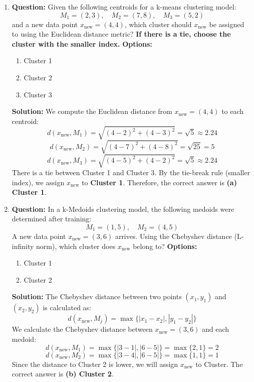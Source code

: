 \documentclass{article}
\begin{document}
\begin{enumerate}

\item \textbf{Question:} \newline
Given the following centroids for a k-means clustering model:
\[
M_1 = (2, 3), \quad M_2 = (7, 8), \quad M_3 = (5, 2)
\]
and a new data point $x_{\text{new}} = (4, 4)$, which cluster should
$x_{\text{new}}$ be assigned to using the Euclidean distance metric?
\textbf{If there is a tie, choose the cluster with the smaller index.}
\newline \newline
\textbf{Options:}
\begin{enumerate}
    \item Cluster 1
    \item Cluster 2
    \item Cluster 3
\end{enumerate}

\textbf{Solution:} \newline
We compute the Euclidean distance from $x_{\text{new}}=(4,4)$ to each centroid:
\[
d(x_{\text{new}}, M_1) = \sqrt{(4 - 2)^2 + (4 - 3)^2} = \sqrt{5} \approx 2.24
\]
\[
d(x_{\text{new}}, M_2) = \sqrt{(4 - 7)^2 + (4 - 8)^2} = \sqrt{25} = 5
\]
\[
d(x_{\text{new}}, M_3) = \sqrt{(4 - 5)^2 + (4 - 2)^2} = \sqrt{5} \approx 2.24
\]
There is a tie between Cluster 1 and Cluster 3. By the tie-break rule (smaller
index), we assign $x_{\text{new}}$ to \textbf{Cluster 1}. Therefore, the correct
answer is \textbf{(a) Cluster 1}.


\item \textbf{Question:} \newline
    In a k-Medoids clustering model, the following medoids were determined after training:
    \[
    M_1 = (1, 5), \quad M_2 = (4, 5)
    \]
    A new data point $x_{\text{new}} = (3, 6)$ arrives. Using the Chebyshev distance (L-infinity norm), which cluster does $x_{\text{new}}$ belong to?
    \newline \newline
    \textbf{Options:}
    \begin{enumerate}
        \item Cluster 1
        \item Cluster 2
    \end{enumerate}
    
    \textbf{Solution:} \newline
    The Chebyshev distance between two points $(x_1, y_1)$ and $(x_2, y_2)$ is calculated as:
    \[
    d(x_{\text{new}}, M_j) = \max\{|x_1 - x_2|, |y_1 - y_2|\}
    \]
    We calculate the Chebyshev distance between $x_{\text{new}} = (3, 6)$ and each medoid:
    \[
    d(x_{\text{new}}, M_1) = \max\{|3 - 1|, |6 - 5|\} = \max\{2, 1\} = 2
    \]
    \[
    d(x_{\text{new}}, M_2) = \max\{|3 - 4|, |6 - 5|\} = \max\{1, 1\} = 1
    \]
    Since the distance to Cluster 2 is lower, we will assign $x_{\text{new}}$ to Cluster.
    The correct answer is \textbf{(b) Cluster 2}.


\end{enumerate}
\end{document}
